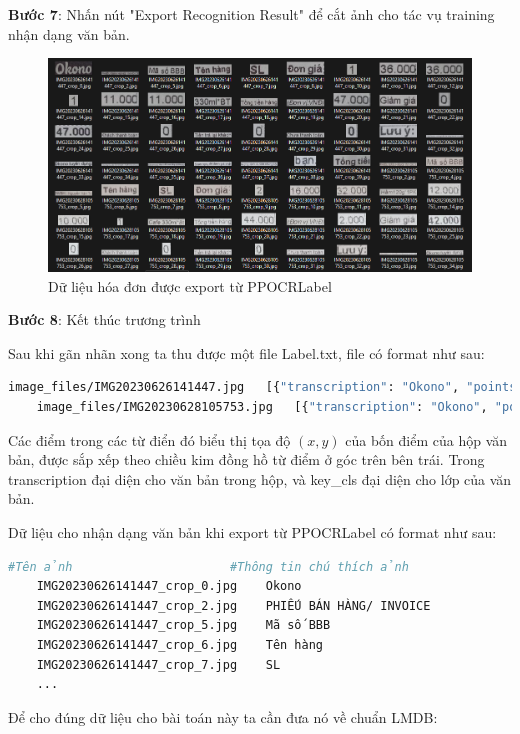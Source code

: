 \textbf{Bước 7}: Nhấn nút "Export Recognition Result" để cắt ảnh cho tác vụ training nhận dạng văn bản.
\begin{figure}[h]
    \includegraphics[scale=0.45]{images/data-invoice-text-recognition.png}
    \centering
    \caption{Dữ liệu hóa đơn được export từ PPOCRLabel}
\end{figure}

\textbf{Bước 8}: Kết thúc trương trình

Sau khi gãn nhãn xong ta thu được một file Label.txt, file có format như sau: 
\begin{lstlisting}[language=bash]
    image_files/IMG20230626141447.jpg	[{"transcription": "Okono", "points": [[440, 195], [807, 201], [805, 333], [438, 327]], "difficult": false, "key_cls": "SELLER"}...]
    image_files/IMG20230628105753.jpg	[{"transcription": "Okono", "points": [[429, 469], [700, 469], [700, 542], [429, 542]], "difficult": true, "key_cls": "SELLER"}...]
\end{lstlisting}

Các điểm trong các từ điển đó biểu thị tọa độ $(x, y)$ của bốn điểm của hộp văn bản, được sắp xếp theo chiều kim đồng hồ từ điểm ở góc trên bên trái. Trong transcription đại diện cho văn bản trong hộp, và key\_cls đại diện cho lớp của văn bản.

Dữ liệu cho nhận dạng văn bản khi export từ PPOCRLabel có format như sau:
\begin{lstlisting}[language=bash]
    #Tên ảnh                      #Thông tin chú thích ảnh
    IMG20230626141447_crop_0.jpg	Okono
    IMG20230626141447_crop_2.jpg	PHIẾU BÁN HÀNG/ INVOICE
    IMG20230626141447_crop_5.jpg	Mã số BBB
    IMG20230626141447_crop_6.jpg	Tên hàng
    IMG20230626141447_crop_7.jpg	SL
    ...
\end{lstlisting}
Để cho đúng dữ liệu cho bài toán này ta cần đưa nó về chuẩn LMDB:

